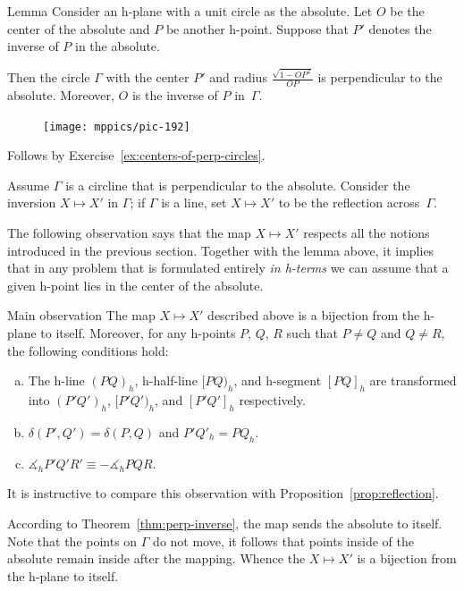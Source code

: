 \begin{thm}{Lemma}\label{lem:P-->O} 
Consider an h-plane with a unit circle as the absolute.
Let $O$ be the center of the absolute and $P$ be another h-point.
Suppose that $P'$ denotes the inverse of $P$ in the absolute.

Then the circle $\Gamma$ with the center $P'$ and radius 
$\tfrac{\sqrt{1-OP^2}}{OP}$
is perpendicular to the absolute.
Moreover, $O$ is the inverse of $P$ in~$\Gamma$. 
\end{thm}

\begin{figure}
\vskip-4mm
\centering
\texttt{[image: mppics/pic-192]}
\end{figure}

Follows by Exercise~\ref{ex:centers-of-perp-circles}.
\qeds

Assume $\Gamma$ is a circline that is perpendicular to the absolute.
Consider the inversion $X\mapsto X'$
in $\Gamma$; 
if $\Gamma$ is a line,
set $X\mapsto X'$ to be the reflection across~$\Gamma$.

The following observation says that the map $X\mapsto X'$ respects all the notions introduced in the previous section.
Together with the lemma above, it implies that in any problem that is formulated entirely {}\emph{in h-terms} we can assume that a given h-point lies in the center of the absolute.

\begin{thm}{Main observation}\label{thm:main-observ}
The map $X\mapsto X'$ described above is a bijection from the h-plane to itself. 
Moreover, for any h-points $P$, $Q$, $R$ such that $P\ne Q$ and $Q\ne R$, the following conditions hold:
\begin{enumerate}[(a)]
\item\label{h-line-to-hline} The h-line $(PQ)_h$, h-half-line $[PQ)_h$, and h-segment $[PQ]_h$ are transformed into $(P'Q')_h$, $[P'Q')_h$, and $[P'Q']_h$ respectively.
\item\label{h-reflect} $\delta(P',Q')=\delta(P,Q)$ and $P'Q'_h=PQ_h$.
\item\label{h-angle-mes} 
$\measuredangle_h P'Q'R'\equiv-\measuredangle_h PQR$.
\end{enumerate}

\end{thm}

It is instructive to compare this observation with Proposition~\ref{prop:reflection}.

According to Theorem~\ref{thm:perp-inverse}, the map sends the absolute to itself. 
Note that the points on $\Gamma$ do not move, it follows that points inside of the absolute remain inside after the mapping.
Whence the $X\mapsto X'$ is a bijection from the h-plane to itself.


